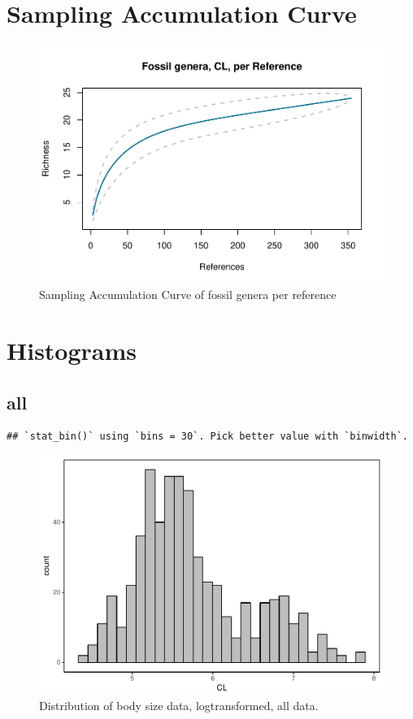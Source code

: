 \documentclass[]{article}
\begin{document}
\section{Sampling Accumulation Curve}\label{sampling-accumulation-curve}

\begin{figure}[htbp]
\centering
\includegraphics{MA_JJ_files/figure-latex/Species Accumulation Curve with Genera-1.pdf}
\caption{Sampling Accumulation Curve of fossil genera per reference}
\end{figure}

\newpage

\section{Histograms}\label{histograms}

\subsection{all}\label{all}

\begin{verbatim}
## `stat_bin()` using `bins = 30`. Pick better value with `binwidth`.
\end{verbatim}

\begin{figure}[htbp]
\centering
\includegraphics{MA_JJ_files/figure-latex/Histograms of body size data, all-1.pdf}
\caption{Distribution of body size data, logtransformed, all data.}
\end{figure}
\end{document}
